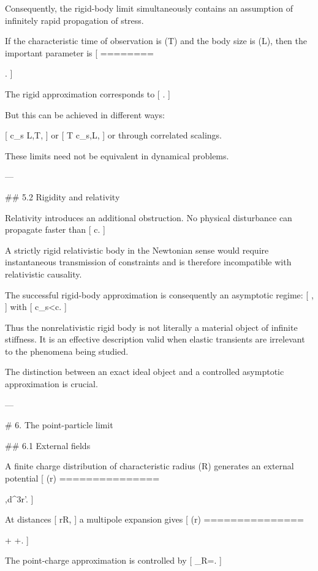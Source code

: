 Consequently, the rigid-body limit simultaneously contains an assumption of infinitely rapid propagation of stress.

If the characteristic time of observation is (T) and the body size is (L), then the important parameter is
[
\epsilon
========

.
]

The rigid approximation corresponds to
[
\epsilon{}.
]

But this can be achieved in different ways:

[
c_s\rightarrow\infty
\quad{}L,T,
]
or
[
T\rightarrow\infty
\quad{}c_s,L,
]
or through correlated scalings.

These limits need not be equivalent in dynamical problems.

---

## 5.2 Rigidity and relativity

Relativity introduces an additional obstruction. No physical disturbance can propagate faster than
[
c.
]

A strictly rigid relativistic body in the Newtonian sense would require instantaneous transmission of constraints and is therefore incompatible with relativistic causality.

The successful rigid-body approximation is consequently an asymptotic regime:
[
,
]
with
[
c_s<c.
]

Thus the nonrelativistic rigid body is not literally a material object of infinite stiffness. It is an effective description valid when elastic transients are irrelevant to the phenomena being studied.

The distinction between an exact ideal object and a controlled asymptotic approximation is crucial.

---

# 6. The point-particle limit

## 6.1 External fields

A finite charge distribution of characteristic radius (R) generates an external potential
[
\Phi(\mathbf r)
===============

\int
{}
,d^3r'.
]

At distances
[
r\gg R,
]
a multipole expansion gives
[
\Phi(\mathbf r)
===============

+
+\cdots.
]

The point-charge approximation is controlled by
[
\epsilon_R=.
]

